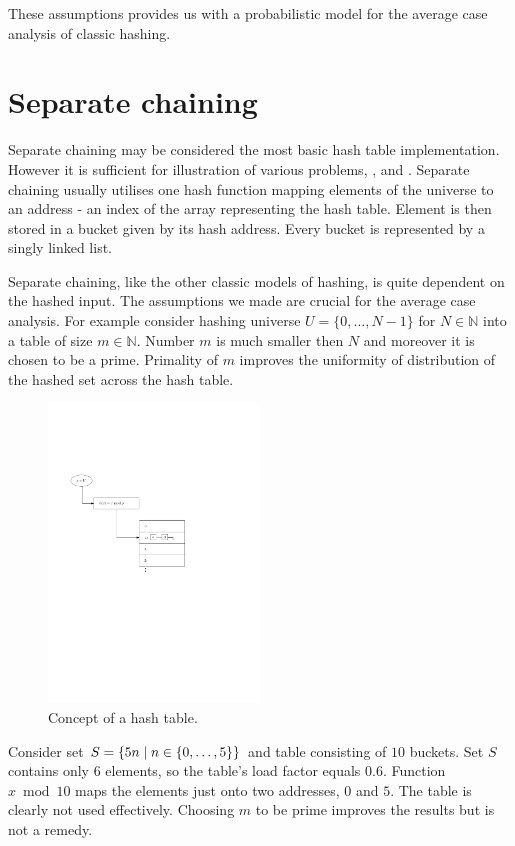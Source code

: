 These assumptions provides us with a probabilistic model for the average case analysis of classic hashing.

\section{Separate chaining}
Separate chaining may be considered the most basic hash table implementation. However it is sufficient for illustration of various problems, \cite{The-art-of-computer-programming}, \cite{DBLP:books/sp/Mehlhorn84} and \cite{DBLP:books/sp/MehlhornS2008}. Separate chaining usually utilises one hash function mapping elements of the universe to an address - an index of the array representing the hash table. Element is then stored in a bucket given by its hash address. Every bucket is represented by a singly linked list. 

Separate chaining, like the other classic models of hashing, is quite dependent on the hashed input. The assumptions we made are crucial for the average case analysis. For example consider hashing universe $U = \{0, \dots, N - 1\}$ for $N \in \mathbb{N}$ into a table of size $m \in \mathbb{N}$. Number $m$ is much smaller then $N$ and moreover it is chosen to be a prime. Primality of $m$ improves the uniformity of distribution of the hashed set across the hash table. 

\begin{figure}
  \centering
    \includegraphics[width=0.5\textwidth]{images/hash_table}
  \caption{Concept of a hash table.}
\end{figure}

\begin{example}
Consider set $S = \{5n \mid n \in \{0, \dots, 5\} \}$ and table consisting of $10$ buckets. Set $S$ contains only 6 elements, so the table's load factor equals $0.6$. Function $x \bmod 10$ maps the elements just onto two addresses, $0$ and $5$. The table is clearly not used effectively. Choosing $m$ to be prime improves the results but is not a remedy.
\end{example}

